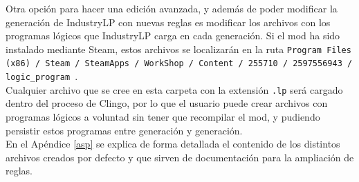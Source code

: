 Otra opción para hacer una edición avanzada, y además de poder modificar la generación de IndustryLP con nuevas reglas es modificar los archivos con los programas lógicos que IndustryLP carga en cada generación. Si el mod ha sido instalado mediante Steam, estos archivos se localizarán en la ruta \texttt{Program Files (x86) / Steam / SteamApps / WorkShop / Content / 255710 / 2597556943 / logic\_program }. \\

Cualquier archivo que se cree en esta carpeta con la extensión \texttt{.lp} será cargado dentro del proceso de Clingo, por lo que el usuario puede crear archivos con programas lógicos a voluntad sin tener que recompilar el mod, y pudiendo persistir estos programas entre generación y generación. \\

En el Apéndice \ref{asp} se explica de forma detallada el contenido de los distintos archivos creados por defecto y que sirven de documentación para la ampliación de reglas.